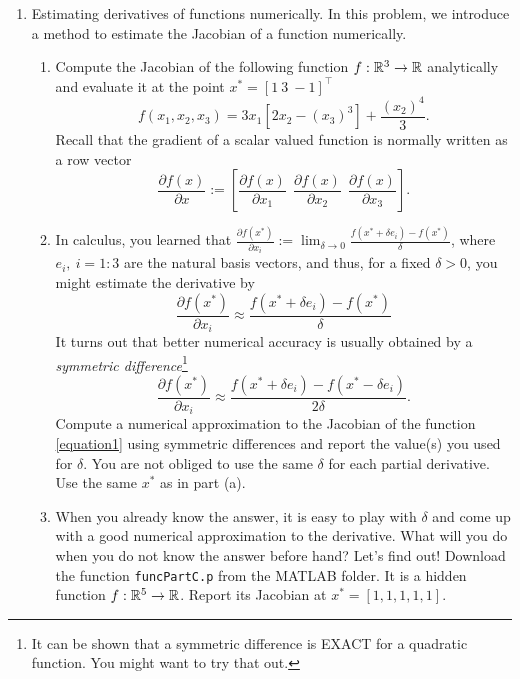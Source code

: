 \documentclass[letterpaper]{article}
\begin{document}
\begin{enumerate}
\begin{enumerate}
\end{enumerate}

\item Estimating derivatives of functions numerically. In this problem, we introduce a method to estimate the Jacobian of a function numerically.

                \begin{enumerate}
\setlength{\itemsep}{.1in}
\renewcommand{\labelenumi}{(\alph{enumi})}
\item Compute the Jacobian of the following function $f:\mathbb R^3 \to \mathbb R$ analytically and  evaluate it at the point $x^*=[1 ~3~ -1]^\top$
 \begin{equation}
    \label{equation1}
    f({x_1} , {x_2} , {x_3})=3{x_1}\left[2{x_2}-({x_3})^3 \right]+ \frac{({x_2})^4}{3}.
\end{equation}
Recall that the gradient of a scalar valued function is normally written as a row vector
$$ \frac{\partial f (x)}{\partial x}:=[  \frac{\partial f(x)}{\partial x_1}~~ \frac{\partial f(x)}{\partial x_2}~~ \frac{\partial f(x)}{\partial x_3}].$$

\item In calculus, you learned that $ \frac{\partial f(x^*)}{\partial x_i}:=\lim_{\delta \to 0} \frac{f({x}^*+ \delta {e}_i)- f({x}^*)}{ \delta}$, where ${e_i} ,\: i=1:3$ are the natural basis vectors, and thus, for a fixed $\delta>0$, you might estimate the derivative by
    $$ \frac{\partial f(x^*)}{\partial x_i} \approx \frac{f({x}^*+  \delta {e}_i)- f({x}^*)}{ \delta}$$
    It turns out that better numerical accuracy is usually obtained by a \textit{symmetric difference}\footnote{It can be shown that a symmetric difference is EXACT for a quadratic function. You might want to try that out.}
\begin{equation}
 \label{equation2}
\frac{\partial f(x^*)}{\partial x_i} \approx \frac{f({x}^* + \delta {e}_i)- f({x}^* - \delta {e}_i)}{2  \delta}.
\end{equation}
Compute a numerical approximation to the Jacobian of the function \eqref{equation1} using symmetric differences and report the value(s) you used for $\delta$. You are not obliged to use the same $\delta$ for each partial derivative. Use the same $x^*$ as in part (a).


\item When you already know the answer, it is easy to play with $\delta$ and come up with a good numerical approximation to the derivative. What will you do when you do not know the answer before hand? Let's find out! Download the function \texttt{funcPartC.p} from the MATLAB folder. It is a hidden function $f: \mathbb R^5 \to \mathbb R$. Report its Jacobian at ${x^*}=[1, 1, 1, 1, 1]$.


\end{enumerate}
\end{enumerate}
\end{document}
